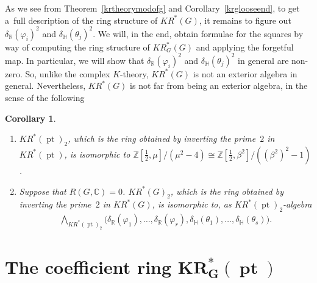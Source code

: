 \documentclass[pdftex]{sigma}
\numberwithin{equation}{section}
\newtheorem{Corollary}[Theorem]{Corollary}
\DeclareMathOperator{\pt}{pt}
\begin{document}
As we see from Theorem~\ref{krtheorymodofg} and Corollary~\ref{krglooseend}, to get a~full description of the ring
structure of $KR^*(G)$, it remains to f\/igure out $\delta_\mathbb{R}(\varphi_i)^2$ and $\delta_\mathbb{H}(\theta_j)^2$.
We will, in the end, obtain formulae for the squares by way of computing the ring structure of $KR_G^*(G)$ and applying
the forgetful map.
In particular, we will show that $\delta_\mathbb{R}(\varphi_i)^2$ and $\delta_\mathbb{H}(\theta_j)^2$ in general are
non-zero.
So, unlike the complex $K$-theory, $KR^*(G)$ is not an exterior algebra in general.
Nevertheless, $KR^*(G)$ is not far from being an exterior algebra, in the sense of the following
\begin{Corollary}\quad
\begin{enumerate}\itemsep=0pt
\item[$1.$]
$KR^*(\pt)_2$, which is the ring obtained by inverting the prime~$2$ in $KR^*(\pt)$, is isomorphic to
$\mathbb{Z}\left[\frac{1}{2}, \mu\right]/(\mu^2-4)\cong\mathbb{Z}\left[\frac{1}{2}, \beta^2\right]/((\beta^2)^2-1)$.
\item[$2.$]
Suppose that $R(G, \mathbb{C})=0$.
$KR^*(G)_2$, which is the ring obtained by inverting the prime~$2$ in $KR^*(G)$, is isomorphic to, as
$KR^*(\pt)_2$-algebra
\begin{gather*}
\bigwedge\nolimits_{KR^*(\pt)_2}\big(\delta_\mathbb{R}(\varphi_1), \dots, \delta_\mathbb{R}(\varphi_r),
\delta_\mathbb{H}(\theta_1), \dots, \delta_\mathbb{H}(\theta_s)\big).
\end{gather*}
\end{enumerate}
\end{Corollary}

\section[The coef\/f\/icient ring $KR_G^*(\pt)$]{The coef\/f\/icient ring $\boldsymbol{KR_G^*(\pt)}$}\label{Section3}
\end{document}
